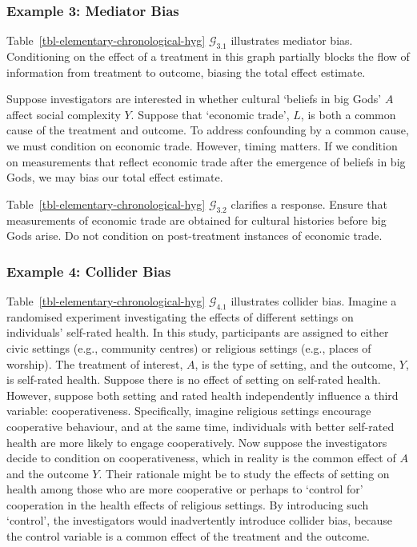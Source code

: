 \documentclass[
  single column]{article}
\begin{document}
\subsubsection{Example 3: Mediator Bias}\label{example-3-mediator-bias}

Table~\ref{tbl-elementary-chronological-hyg} \(\mathcal{G}_{3.1}\)
illustrates mediator bias. Conditioning on the effect of a treatment in
this graph partially blocks the flow of information from treatment to
outcome, biasing the total effect estimate.

Suppose investigators are interested in whether cultural `beliefs in big
Gods' \(A\) affect social complexity \(Y\). Suppose that `economic
trade', \(L\), is both a common cause of the treatment and outcome. To
address confounding by a common cause, we must condition on economic
trade. However, timing matters. If we condition on measurements that
reflect economic trade after the emergence of beliefs in big Gods, we
may bias our total effect estimate.

Table~\ref{tbl-elementary-chronological-hyg} \(\mathcal{G}_{3.2}\)
clarifies a response. Ensure that measurements of economic trade are
obtained for cultural histories before big Gods arise. Do not condition
on post-treatment instances of economic trade.

\subsubsection{Example 4: Collider Bias}\label{example-4-collider-bias}

Table~\ref{tbl-elementary-chronological-hyg} \(\mathcal{G}_{4.1}\)
illustrates collider bias. Imagine a randomised experiment investigating
the effects of different settings on individuals' self-rated health. In
this study, participants are assigned to either civic settings (e.g.,
community centres) or religious settings (e.g., places of worship). The
treatment of interest, \(A\), is the type of setting, and the outcome,
\(Y\), is self-rated health. Suppose there is no effect of setting on
self-rated health. However, suppose both setting and rated health
independently influence a third variable: cooperativeness. Specifically,
imagine religious settings encourage cooperative behaviour, and at the
same time, individuals with better self-rated health are more likely to
engage cooperatively. Now suppose the investigators decide to condition
on cooperativeness, which in reality is the common effect of \(A\) and
the outcome \(Y\). Their rationale might be to study the effects of
setting on health among those who are more cooperative or perhaps to
`control for' cooperation in the health effects of religious settings.
By introducing such `control', the investigators would inadvertently
introduce collider bias, because the control variable is a common effect
of the treatment and the outcome.
\end{document}
